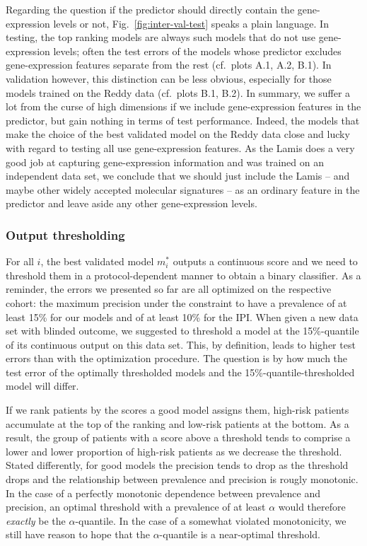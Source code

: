 Regarding the question if the predictor should directly contain the gene-expression levels or not,
Fig.\ \ref{fig:inter-val-test} speaks a plain language. In testing, the top ranking models are 
always such models that do not use gene-expression levels; often the test errors of the models whose 
predictor excludes gene-expression features separate from the rest (cf.\ plots A.1, A.2, B.1). In 
validation however, this distinction can be less obvious, especially for those models trained on 
the Reddy data (cf.\ plots B.1, B.2). In summary, we suffer a lot from the curse of high dimensions 
if we include gene-expression features in the predictor, but gain nothing in terms of test 
performance. Indeed, the models that make the choice of the best validated model on the Reddy data 
close and lucky with regard to testing all use gene-expression features. As the Lamis does a very 
good job at capturing gene-expression information and was trained on an independent data set, we 
conclude that we should just include the Lamis -- and maybe other widely accepted molecular 
signatures -- as an ordinary feature in the predictor and leave aside any other gene-expression 
levels.

\subsubsection{Output thresholding}




For all $i$, the best validated model $m_i^*$ outputs a continuous score and we need to threshold 
them in a protocol-dependent manner to obtain a binary classifier. As a reminder, the errors we 
presented so far are all optimized on the respective cohort: the maximum precision under the 
constraint to have a prevalence of at least \num{15}\% for our models and of at least \num{10}\% 
for the IPI. When given a new data set with blinded outcome, we suggested to threshold a model at 
the \num{15}\%-quantile of its continuous output on this data set. This, by definition, leads to 
higher test errors than with the optimization procedure. The question is by how much the test error 
of the optimally thresholded models and the \num{15}\%-quantile-thresholded model will differ.

If we rank patients by the scores a good model assigns them, high-risk patients accumulate at the 
top of the ranking and low-risk patients at the bottom. As a result, the group of patients with a
score above a threshold tends to comprise a lower and lower proportion of high-risk patients as 
we decrease the threshold. Stated differently, for good models the precision tends to drop as the 
threshold drops and the relationship between prevalence and precision is rougly monotonic. In the 
case of a perfectly monotonic dependence between prevalence and precision, an optimal threshold 
with a prevalence of at least $\alpha$ would therefore \textit{exactly} be the $\alpha$-quantile. 
In the case of a somewhat violated monotonicity, we still have reason to hope that the 
$\alpha$-quantile is a near-optimal threshold.

